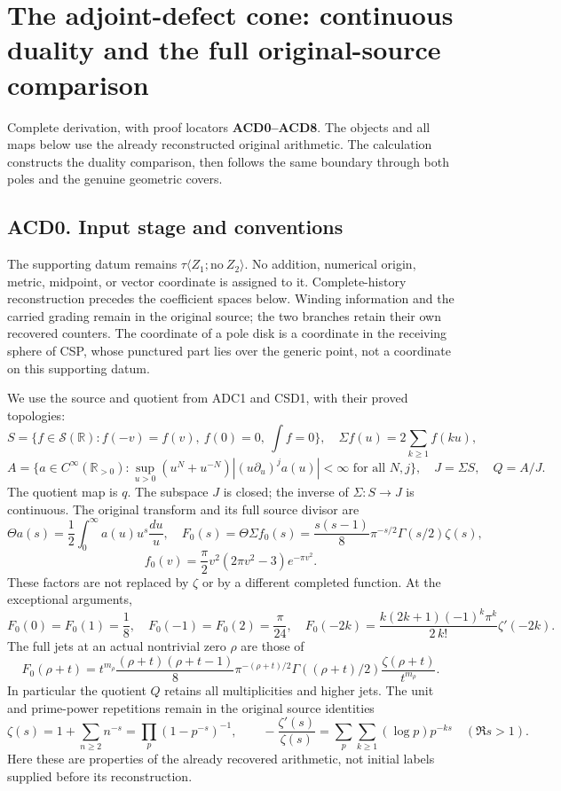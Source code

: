 \section{The adjoint-defect cone: continuous duality and the full
original-source
comparison}\label{the-adjoint-defect-cone-continuous-duality-and-the-full-original-source-comparison}

Complete derivation, with proof locators \textbf{ACD0--ACD8}. The
objects and all maps below use the already reconstructed original
arithmetic. The calculation constructs the duality comparison, then
follows the same boundary through both poles and the genuine geometric
covers.

\subsection{ACD0. Input stage and
conventions}\label{acd0.-input-stage-and-conventions}

The supporting datum remains
\(\tau\langle Z_1;\mathrm{no}\ Z_2\rangle\). No addition, numerical
origin, metric, midpoint, or vector coordinate is assigned to it.
Complete-history reconstruction precedes the coefficient spaces below.
Winding information and the carried grading remain in the original
source; the two branches retain their own recovered counters. The
coordinate of a pole disk is a coordinate in the receiving sphere of
CSP, whose punctured part lies over the generic point, not a coordinate
on this supporting datum.

We use the source and quotient from ADC1 and CSD1, with their proved
topologies: \[
S=\{f\in\mathcal S(\mathbb R):f(-v)=f(v),\ f(0)=0,\ \int f=0\},
\quad \Sigma f(u)=2\sum_{k\geq1}f(ku),
\] \[
A=\{a\in C^\infty(\mathbb R_{>0}):
\sup_{u>0}(u^N+u^{-N})|(u\partial_u)^ja(u)|<\infty
\text{ for all }N,j\},\quad J=\Sigma S,\quad Q=A/J.
\tag{ACD0.1}
\] The quotient map is \(q\). The subspace \(J\) is closed; the inverse
of \(\Sigma:S\to J\) is continuous. The original transform and its full
source divisor are \[
\Theta a(s)=\frac12\int_0^\infty a(u)u^s\frac{du}{u},\quad
F_0(s)=\Theta\Sigma f_0(s)
=\frac{s(s-1)}8\pi^{-s/2}\Gamma(s/2)\zeta(s),
\] \[
f_0(v)=\frac\pi2 v^2(2\pi v^2-3)e^{-\pi v^2}.
\tag{ACD0.2}
\] These factors are not replaced by \(\zeta\) or by a different
completed function. At the exceptional arguments, \[
F_0(0)=F_0(1)=\frac18,\quad F_0(-1)=F_0(2)=\frac\pi{24},\quad
F_0(-2k)=\frac{k(2k+1)(-1)^k\pi^k}{2\,k!}\zeta'(-2k).
\tag{ACD0.3}
\] The full jets at an actual nontrivial zero \(\rho\) are those of \[
F_0(\rho+t)=t^{m_\rho}
\frac{(\rho+t)(\rho+t-1)}8\pi^{-(\rho+t)/2}
\Gamma((\rho+t)/2)\frac{\zeta(\rho+t)}{t^{m_\rho}}.
\tag{ACD0.4}
\] In particular the quotient \(Q\) retains all multiplicities and
higher jets. The unit and prime-power repetitions remain in the original
source identities \[
\zeta(s)=1+\sum_{n\geq2}n^{-s}=\prod_p(1-p^{-s})^{-1},\qquad
-\frac{\zeta'(s)}{\zeta(s)}=\sum_p\sum_{k\geq1}(\log p)p^{-ks}
\quad(\Re s>1).
\tag{ACD0.5}
\] Here these are properties of the already recovered arithmetic, not
initial labels supplied before its reconstruction.

